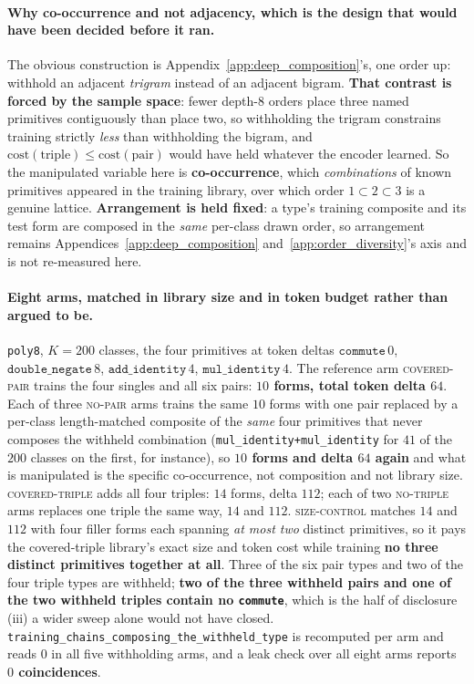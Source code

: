 \paragraph{Why co-occurrence and not adjacency, which is the design that would have been decided before it ran.} The obvious construction is Appendix~\ref{app:deep_composition}'s, one order up: withhold an adjacent \emph{trigram} instead of an adjacent bigram. \textbf{That contrast is forced by the sample space}: fewer depth-$8$ orders place three named primitives contiguously than place two, so withholding the trigram constrains training strictly \emph{less} than withholding the bigram, and $\mathrm{cost}(\text{triple})\leq\mathrm{cost}(\text{pair})$ would have held whatever the encoder learned. So the manipulated variable here is \textbf{co-occurrence}, which \emph{combinations} of known primitives appeared in the training library, over which order $1\subset2\subset3$ is a genuine lattice. \textbf{Arrangement is held fixed}: a type's training composite and its test form are composed in the \emph{same} per-class drawn order, so arrangement remains Appendices~\ref{app:deep_composition} and~\ref{app:order_diversity}'s axis and is not re-measured here.

\paragraph{Eight arms, matched in library size and in token budget rather than argued to be.} \texttt{poly8}, $K{=}200$ classes, the four primitives at token deltas $\texttt{commute}\,0$, $\texttt{double\_negate}\,8$, $\texttt{add\_identity}\,4$, $\texttt{mul\_identity}\,4$. The reference arm \textsc{covered-pair} trains the four singles and all six pairs: \textbf{$10$ forms, total token delta $64$}. Each of three \textsc{no-pair} arms trains the same $10$ forms with one pair replaced by a per-class length-matched composite of the \emph{same} four primitives that never composes the withheld combination (\texttt{mul\_identity+mul\_identity} for $41$ of the $200$ classes on the first, for instance), so \textbf{$10$ forms and delta $64$ again} and what is manipulated is the specific co-occurrence, not composition and not library size. \textsc{covered-triple} adds all four triples: $14$ forms, delta $112$; each of two \textsc{no-triple} arms replaces one triple the same way, $14$ and $112$. \textsc{size-control} matches $14$ and $112$ with four filler forms each spanning \emph{at most two} distinct primitives, so it pays the covered-triple library's exact size and token cost while training \textbf{no three distinct primitives together at all}. Three of the six pair types and two of the four triple types are withheld; \textbf{two of the three withheld pairs and one of the two withheld triples contain no \texttt{commute}}, which is the half of disclosure (iii) a wider sweep alone would not have closed. \texttt{training\_chains\_composing\_the\_withheld\_type} is recomputed per arm and reads $0$ in all five withholding arms, and a leak check over all eight arms reports \textbf{$0$ coincidences}.

